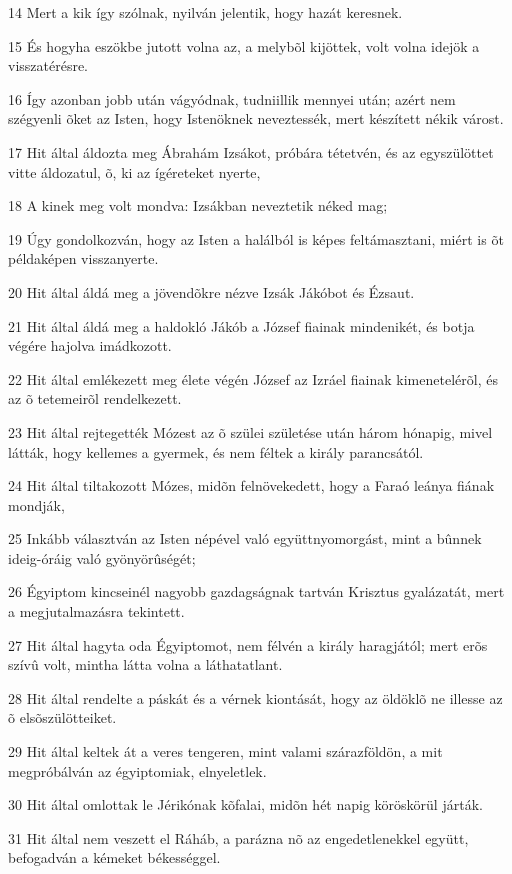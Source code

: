 \par 14 Mert a kik így szólnak, nyilván jelentik, hogy hazát keresnek.
\par 15 És hogyha eszökbe jutott volna az, a melybõl kijöttek, volt volna idejök a visszatérésre.
\par 16 Így azonban jobb után vágyódnak, tudniillik mennyei után; azért nem szégyenli õket az Isten, hogy Istenöknek neveztessék, mert készített nékik várost.
\par 17 Hit által áldozta meg Ábrahám Izsákot, próbára tétetvén, és az egyszülöttet vitte áldozatul, õ, ki az ígéreteket nyerte,
\par 18 A kinek meg volt mondva: Izsákban neveztetik néked mag;
\par 19 Úgy gondolkozván, hogy az Isten a halálból is képes feltámasztani, miért is õt példaképen visszanyerte.
\par 20 Hit által áldá meg a jövendõkre nézve Izsák Jákóbot és Ézsaut.
\par 21 Hit által áldá meg a haldokló Jákób a József fiainak mindenikét, és botja végére hajolva imádkozott.
\par 22 Hit által emlékezett meg élete végén József az Izráel fiainak kimenetelérõl, és az õ tetemeirõl rendelkezett.
\par 23 Hit által rejtegették Mózest az õ szülei születése után három hónapig, mivel látták, hogy kellemes a gyermek, és nem féltek a király parancsától.
\par 24 Hit által tiltakozott Mózes, midõn felnövekedett, hogy a Faraó leánya fiának mondják,
\par 25 Inkább választván az Isten népével való együttnyomorgást, mint a bûnnek ideig-óráig való gyönyörûségét;
\par 26 Égyiptom kincseinél nagyobb gazdagságnak tartván Krisztus gyalázatát, mert a megjutalmazásra tekintett.
\par 27 Hit által hagyta oda Égyiptomot, nem félvén a király haragjától; mert erõs szívû volt, mintha látta volna a láthatatlant.
\par 28 Hit által rendelte a páskát és a vérnek kiontását, hogy az öldöklõ ne illesse az õ elsõszülötteiket.
\par 29 Hit által keltek át a veres tengeren, mint valami szárazföldön, a mit megpróbálván az égyiptomiak, elnyeletlek.
\par 30 Hit által omlottak le Jérikónak kõfalai, midõn hét napig köröskörül járták.
\par 31 Hit által nem veszett el Ráháb, a parázna nõ az engedetlenekkel együtt, befogadván a kémeket békességgel.

